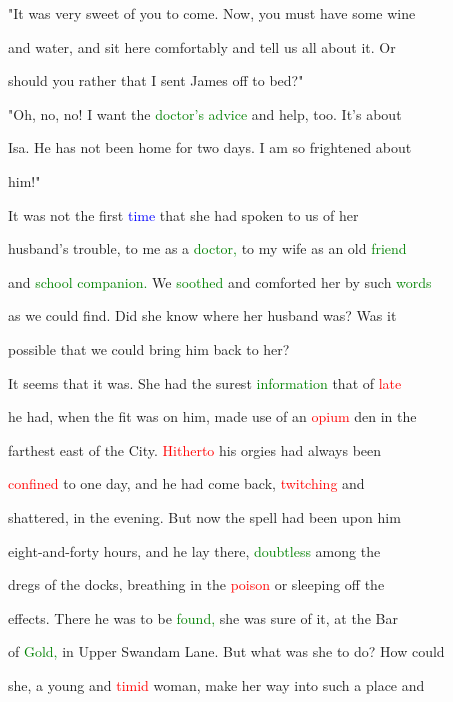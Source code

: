  "It was very \textcolor{BurntOrange}{sweet} of you to come. Now, you must have some wine

 and water, and sit here comfortably and tell us all about it. Or

 should you rather that I sent James off to bed?"



 "Oh, no, no! I want the \textcolor{green}{doctor's} \textcolor{green}{advice} and help, too. It's about

 Isa. He has not been home for two days. I am so \textcolor{BurntOrange}{frightened} about

 him!"



 It was not the first \textcolor{blue}{time} that she had spoken to us of her

 husband's trouble, to me as a \textcolor{green}{doctor,} to my wife as an old \textcolor{green}{friend}

 and \textcolor{green}{school} \textcolor{green}{companion.} We \textcolor{green}{soothed} and \textcolor{BurntOrange}{comforted} her by such \textcolor{green}{words}

 as we could find. Did she know where her husband was? Was it

 possible that we could bring him back to her?



 It seems that it was. She had the surest \textcolor{green}{information} that of \textcolor{red}{late}

 he had, when the fit was on him, made use of an \textcolor{red}{opium} den in the

 farthest east of the City. \textcolor{red}{Hitherto} his orgies had always been

 \textcolor{red}{confined} to one day, and he had come back, \textcolor{red}{twitching} and

 \textcolor{BurntOrange}{shattered,} in the evening. But now the spell had been upon him

 eight-and-forty hours, and he lay there, \textcolor{green}{doubtless} among the

 dregs of the docks, breathing in the \textcolor{red}{poison} or sleeping off the

 effects. There he was to be \textcolor{green}{found,} she was sure of it, at the Bar

 of \textcolor{green}{Gold,} in Upper Swandam Lane. But what was she to do? How could

 she, a \textcolor{BurntOrange}{young} and \textcolor{red}{timid} woman, make her way into such a place and

